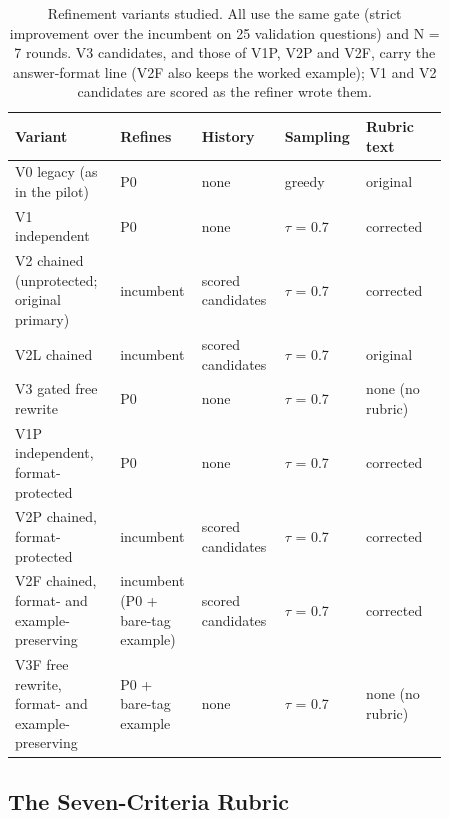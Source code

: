 \documentclass{ieeeaccess}
\begin{document}
\begin{table}[htbp]
\centering
\small
\caption{Refinement variants studied. All use the same gate (strict improvement over the incumbent on 25 validation questions) and N = 7 rounds. V3 candidates, and those of V1P, V2P and V2F, carry the answer-format line (V2F also keeps the worked example); V1 and V2 candidates are scored as the refiner wrote them.}
\begin{tabular}{>{\raggedright\arraybackslash}p{0.232\linewidth}>{\raggedright\arraybackslash}p{0.146\linewidth}>{\raggedright\arraybackslash}p{0.189\linewidth}>{\raggedright\arraybackslash}p{0.103\linewidth}>{\raggedright\arraybackslash}p{0.189\linewidth}}
\toprule
\textbf{Variant} & \textbf{Refines} & \textbf{History} & \textbf{Sampling} & \textbf{Rubric text} \\
\midrule
V0 legacy (as in the pilot) & P0 & none & greedy & original \\
V1 independent & P0 & none & $\tau$ = 0.7 & corrected \\
V2 chained (unprotected; original primary) & incumbent & scored candidates & $\tau$ = 0.7 & corrected \\
V2L chained & incumbent & scored candidates & $\tau$ = 0.7 & original \\
V3 gated free rewrite & P0 & none & $\tau$ = 0.7 & none (no rubric) \\
V1P independent, format-protected & P0 & none & $\tau$ = 0.7 & corrected \\
V2P chained, format-protected & incumbent & scored candidates & $\tau$ = 0.7 & corrected \\
V2F chained, format- and example-preserving & incumbent (P0 + bare-tag example) & scored candidates & $\tau$ = 0.7 & corrected \\
V3F free rewrite, format- and example-preserving & P0 + bare-tag example & none & $\tau$ = 0.7 & none (no rubric) \\
\bottomrule
\end{tabular}
\end{table}

\subsection{The Seven-Criteria Rubric}
\end{document}
